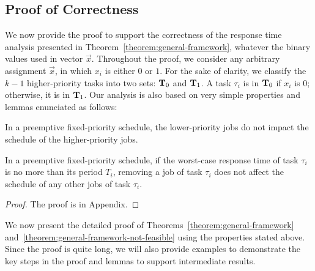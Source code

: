 \subsection{Proof of Correctness}  
\label{sec:proof-th1}

We now provide the proof to support the correctness of the response time analysis presented in
Theorem~\ref{theorem:general-framework}, whatever the binary values
used in vector $\vec{x}$.  %
Throughout the proof, we consider any arbitrary assignment
$\vec{x}$, in which $x_i$ is either $0$ or $1$. For the sake of clarity, we classify the $k-1$
higher-priority tasks into two sets: ${\bf T}_0$ and ${\bf T}_1$. A
task $\tau_i$ is in ${\bf T}_0$ if $x_i$ is $0$; otherwise, it is in
${\bf T}_1$.
Our analysis is also based on very simple properties and lemmas enunciated as follows:

\begin{Property}
\label{prop:lower-priority}
In a preemptive fixed-priority schedule, the lower-priority jobs do not impact the schedule of the higher-priority jobs.
\end{Property}


\begin{Lemma}
\label{lemma:remove-same-task}
In a preemptive fixed-priority schedule, if the worst-case response time of task $\tau_i$ is no more than its period $T_i$, removing a job of task $\tau_i$ does not affect the schedule of any other jobs of task $\tau_i$.
\end{Lemma}
\begin{proof}
The proof is in Appendix\citetechreport{}.
\end{proof}


We now present the detailed proof of
Theorems~\ref{theorem:general-framework} and~\ref{theorem:general-framework-not-feasible} using the properties stated above. Since the proof is quite long, we 
will also provide examples to demonstrate the key steps in the proof and lemmas to support intermediate results.

